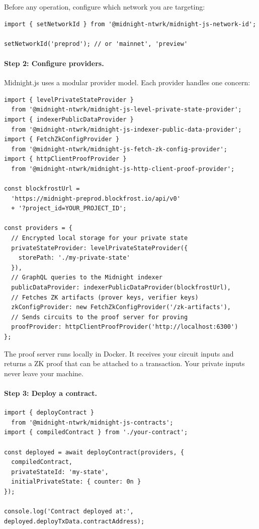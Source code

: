 Before any operation, configure which network you are targeting:

\begin{verbatim}
import { setNetworkId } from '@midnight-ntwrk/midnight-js-network-id';

setNetworkId('preprod'); // or 'mainnet', 'preview'
\end{verbatim}

\paragraph{Step 2: Configure providers.}

Midnight.js uses a modular provider model. Each provider handles one concern:

\begin{verbatim}
import { levelPrivateStateProvider }
  from '@midnight-ntwrk/midnight-js-level-private-state-provider';
import { indexerPublicDataProvider }
  from '@midnight-ntwrk/midnight-js-indexer-public-data-provider';
import { FetchZkConfigProvider }
  from '@midnight-ntwrk/midnight-js-fetch-zk-config-provider';
import { httpClientProofProvider }
  from '@midnight-ntwrk/midnight-js-http-client-proof-provider';

const blockfrostUrl =
  'https://midnight-preprod.blockfrost.io/api/v0'
  + '?project_id=YOUR_PROJECT_ID';

const providers = {
  // Encrypted local storage for your private state
  privateStateProvider: levelPrivateStateProvider({
    storePath: './my-private-state'
  }),
  // GraphQL queries to the Midnight indexer
  publicDataProvider: indexerPublicDataProvider(blockfrostUrl),
  // Fetches ZK artifacts (prover keys, verifier keys)
  zkConfigProvider: new FetchZkConfigProvider('/zk-artifacts'),
  // Sends circuits to the proof server for proving
  proofProvider: httpClientProofProvider('http://localhost:6300')
};
\end{verbatim}

The proof server runs locally in Docker. It receives your circuit inputs and returns a ZK proof that can be attached to a transaction. Your private inputs never leave your machine.

\paragraph{Step 3: Deploy a contract.}

\begin{verbatim}
import { deployContract }
  from '@midnight-ntwrk/midnight-js-contracts';
import { compiledContract } from './your-contract';

const deployed = await deployContract(providers, {
  compiledContract,
  privateStateId: 'my-state',
  initialPrivateState: { counter: 0n }
});

console.log('Contract deployed at:', deployed.deployTxData.contractAddress);
\end{verbatim}

